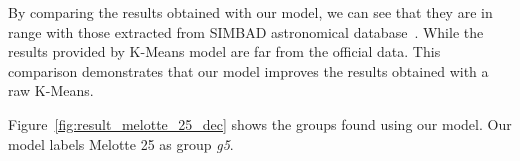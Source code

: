 \documentclass[11pt,a4paper,english,twocolumn]{article}
\begin{document}
By comparing the results obtained with our model, we can see that they are in range with those extracted
from SIMBAD astronomical database~\cite{wenger2000simbad}. While the results provided by K-Means model are
far from the official data. This comparison demonstrates that our model improves the results obtained with
a raw K-Means.

\begin{table}[!htbp]
  \begin{center}
    \caption{Summary for the Melotte 25 results.}
    \label{tab:results_melotte_25}
  \end{center}
\end{table}

Figure~\ref{fig:result_melotte_25_dec} shows the groups found using our model.
Our model labels Melotte 25 as group \emph{g5}.
\end{document}
